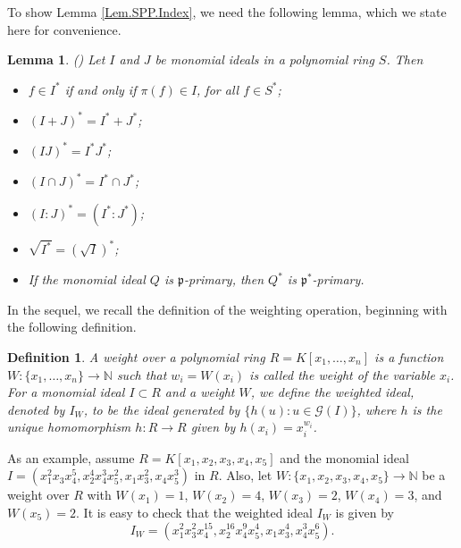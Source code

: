 \documentclass[11pt]{amsart}
\newtheorem{lemma}[theorem]{Lemma}
\newtheorem{definition}[theorem]{Definition}
\begin{document}
\bigskip
 To show Lemma \ref{Lem.SPP.Index}, we need the  following  lemma, which we state here for convenience.
 
 
\begin{lemma} (\cite [Lemma 1.1]{BH}) \label{Lem.Bayati.Expansion}
Let $I$ and $J$ be monomial ideals in a polynomial ring $S$. Then
\begin{itemize}
\item[(i)] $f \in I^*$ if and only if $\pi(f)\in I$, for all $f\in S^*$;
\item[(ii)] $(I + J)^* = I^* + J^*$;
\item[(iii)] $(IJ)^* = I^*J^*$;
\item[(iv)] $(I \cap J)^* = I^*\cap J^*$;
\item[(v)] $(I : J)^* = (I^* : J^*)$;
\item[(vi)] $\sqrt{I^*} = (\sqrt{I})^*$;
\item[(vii)] If the monomial ideal $Q$ is $\mathfrak{p}$-primary, then $Q^*$ is
$\mathfrak{p}^*$-primary.
\end{itemize}
\end{lemma}


In the sequel, we recall the definition of the weighting operation, beginning with the following definition.


\begin{definition}
\em{
A \textit{weight} over a polynomial ring $R=K[x_1, \ldots, x_n]$ is a function $W: \{x_1, \ldots, x_n\} \rightarrow \mathbb{N}$ such that  $w_i=W(x_i)$ is called the {\it weight} of the variable $x_i$. For a monomial ideal $I\subset R $ and a weight $W$, we define the \textit{weighted ideal}, denoted 
by $I_W$, to be the ideal generated by $\{h(u) : u\in \mathcal{G}(I) \}$, where $h$ is the unique homomorphism $h: R \rightarrow R$ given by 
$h(x_i)= x_i^{w_i}$. 
}
\end{definition}


As  an example, assume   $R=K[x_1, x_2, x_3, x_4, x_5]$ and the monomial ideal  $I=(x_1^2x_3x_4^5, x_2^4x_4^3x_5^2, x_1x_3^2, x_4x_5^3)$ in $R$. 
Also,  let $W : \{x_1, x_2, x_3, x_4, x_5\} \rightarrow \mathbb{N}$ be a weight over $R$ with $W(x_1)=1$, $W(x_2)=4$, $W(x_3)=2$, $W(x_4)=3$, and $W(x_5)=2$. It is easy to  check that  the weighted ideal $I_W$ is given by 
$$I_W=(x_1^2x_3^2x_4^{15}, x_2^{16}x_4^9x_5^4, x_1x_3^4, x_4^3x_5^6).$$
\end{document}
